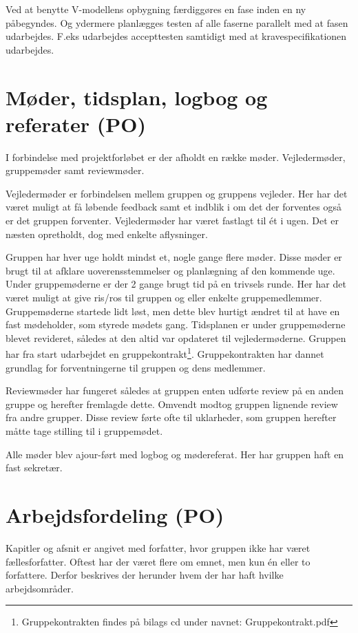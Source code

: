 Ved at benytte V-modellens opbygning færdiggøres en fase inden en ny påbegyndes. Og ydermere planlægges testen af alle faserne parallelt med at fasen udarbejdes. F.eks udarbejdes accepttesten samtidigt med at kravespecifikationen udarbejdes.  

\section{Møder, tidsplan, logbog og referater (PO)}

I forbindelse med projektforløbet er der afholdt en række møder. Vejledermøder, gruppemøder samt reviewmøder.

Vejledermøder er forbindelsen mellem gruppen og gruppens vejleder. Her har det været muligt at få løbende feedback samt et indblik i om det der forventes også er det gruppen forventer. Vejledermøder har været fastlagt til ét i ugen. Det er næsten opretholdt, dog med enkelte aflysninger.

Gruppen har hver uge holdt mindst et, nogle gange flere møder. Disse møder er brugt til at afklare uoverensstemmelser og planlægning af den kommende uge. Under gruppemøderne er der 2 gange brugt tid på en trivsels runde. Her har det været muligt at give ris/ros til gruppen og eller enkelte gruppemedlemmer. Gruppemøderne startede lidt løst, men dette blev hurtigt ændret til at have en fast mødeholder, som styrede mødets gang. Tidsplanen er under gruppemøderne blevet revideret, således at den altid var opdateret til vejledermøderne. Gruppen har fra start udarbejdet en gruppekontrakt\footnote{Gruppekontrakten findes på bilags cd under navnet: Gruppekontrakt.pdf}. Gruppekontrakten har dannet grundlag for forventningerne til gruppen og dens medlemmer.

Reviewmøder har fungeret således at gruppen enten udførte review på en anden gruppe og herefter fremlagde dette. Omvendt modtog gruppen lignende review fra andre grupper. Disse review førte ofte til uklarheder, som gruppen herefter måtte tage stilling til i gruppemødet.

Alle møder blev ajour-ført med logbog og mødereferat. Her har gruppen haft en fast sekretær. 


\section{Arbejdsfordeling (PO)}
 
Kapitler og afsnit er angivet med forfatter, hvor gruppen ikke har været fællesforfatter. Oftest har der været flere om emnet, men kun én eller to forfattere. Derfor beskrives der herunder hvem der har haft hvilke arbejdsområder.  

